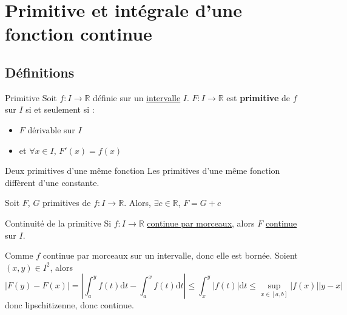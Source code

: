 











\section{Primitive et intégrale d'une fonction continue} %

\subsection{Définitions} %
\label{sub:Définitions}


\begin{Definition}[colbacktitle=red!75!black]{Primitive}{}
Soit $f : I \to \mathbb{R}$ définie sur un \underline{intervalle} $I$. $F : I \to \mathbb{R}$ est \textbf{primitive} de $f$ sur $I$ si et seulement si :
\begin{itemize}

    \item $F$ dérivable sur $I$ 
    \item et $\forall x \in I$, $F'(x) = f(x)$

\end{itemize}
\end{Definition}

\begin{Prop}{Deux primitives d'une même fonction}{}
  Les primitives d'une même fonction diffèrent d'une constante.

Soit $F$, $G$ primitives de $f : I \to \mathbb{R}$. Alors, $\exists c \in \mathbb{R}$, $F = G + c$
\end{Prop}

\begin{Lenma}{Continuité de la primitive}{}
Si $f : I \to \mathbb{R}$ \underline{continue par morceaux}, alors $F$ \underline{continue} sur $I$.
\end{Lenma}

\begin{myproof}{}{}
  Comme $f$ continue par morceaux sur un intervalle, donc elle est bornée.
Soient $(x, y) \in I ^{2}$, alors 
\begin{equation}
  |F(y) - F(x) | = \left| \int_{a}^{y} f(t) \mathrm{d} t - \int_{a}^{x} f(t) \mathrm{d} t \right| \le \int_{x}^{y} |f(t) | \mathrm{d} t \le \sup _{x \in [a,b]} |f(x)| |y-x|
\end{equation}
donc lipschitizenne, donc continue.
\end{myproof}

